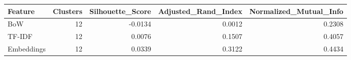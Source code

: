\begin{tabular}{lrrrr}
\toprule
Feature & Clusters & Silhouette_Score & Adjusted_Rand_Index & Normalized_Mutual_Info \\
\midrule
BoW & 12 & -0.0134 & 0.0012 & 0.2308 \\
TF-IDF & 12 & 0.0076 & 0.1507 & 0.4057 \\
Embeddings & 12 & 0.0339 & 0.3122 & 0.4434 \\
\bottomrule
\end{tabular}
